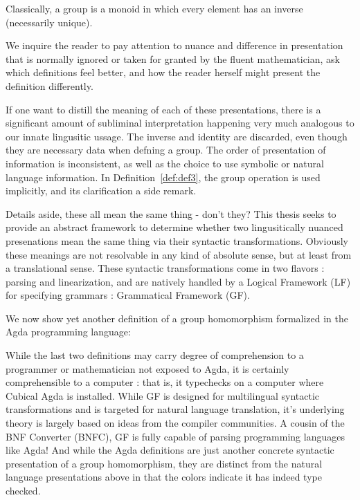 
\begin{definition}\label{def:def4}
Classically, a group is a monoid in which every element has an inverse (necessarily unique).
\end{definition}

We inquire the reader to pay attention to nuance and difference in presentation
that is normally ignored or taken for granted by the fluent mathematician, ask
which definitions feel better, and how the reader herself might present the
definition differently.

If one want to distill the meaning of each of these presentations, there is a
significant amount of subliminal interpretation happening very much analogous to
our innate lingusitic ussage. The inverse and identity are discarded, even
though they are necessary data when defning a group. The order of presentation
of information is inconsistent, as well as the choice to use symbolic or natural
language information. In Definition~\ref{def:def3}, the group operation is used
implicitly, and its clarification a side remark.

Details aside, these all mean the same thing - don't they?  This thesis seeks to provide an
abstract framework to determine whether two lingusitically nuanced presenations
mean the same thing via their syntactic transformations. Obviously these
meanings  are not resolvable in any kind of absolute sense, but at least from a
translational sense. These syntactic transformations come in two flavors : parsing and
linearization, and are natively handled by a Logical Framework (LF) for
specifying grammars : Grammatical Framework (GF).

We now show yet another definition of a group homomorphism formalized in the
Agda programming language:


While the last two definitions may carry degree of comprehension to a programmer
or mathematician not exposed to Agda, it is certainly comprehensible to a
computer : that is, it typechecks on a computer where Cubical Agda is installed.
While GF is designed for multilingual syntactic transformations and is targeted
for natural language translation, it's underlying theory is largely based on
ideas from the compiler communities. A cousin of the BNF Converter (BNFC), GF is
fully capable of parsing programming languages like Agda! And while the Agda
definitions are just another concrete syntactic presentation of a group
homomorphism, they are distinct from the natural language presentations above in
that the colors indicate it has indeed type checked.


